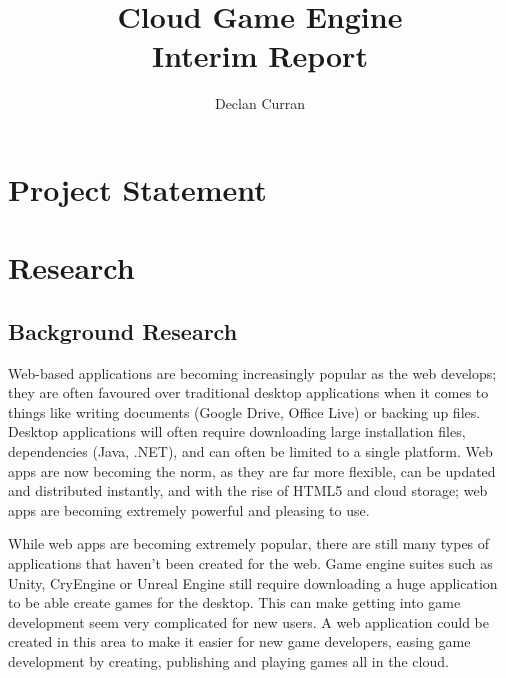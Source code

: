 \documentclass[a4paper, 12pt]{article}
\begin{document}
\title{
	{Cloud Game Engine}\\
	\large{Interim Report}\\
}
\author{Declan Curran}
\maketitle
\newpage

\setcounter{tocdepth}{3}
\tableofcontents
\newpage

\section{Project Statement}
\section{Research}
\subsection{Background Research}

Web-based applications are becoming increasingly popular as the web develops; they are often favoured over traditional desktop applications when it comes to things like writing documents (Google Drive, Office Live) or backing up files. Desktop applications will often require downloading large installation files, dependencies (Java, .NET), and can often be limited to a single platform. Web apps are now becoming the norm, as they are far more flexible, can be updated and distributed instantly, and with the rise of HTML5 and cloud storage; web apps are becoming extremely powerful and pleasing to use.



While web apps are becoming extremely popular, there are still many types of applications that haven't been created for the web. Game engine suites such as Unity, CryEngine or Unreal Engine still require downloading a huge application to be able create games for the desktop. This can make getting into game development seem very complicated for new users. A web application could be created in this area to make it easier for new game developers, easing game development by creating, publishing and playing games all in the cloud.
\end{document}
